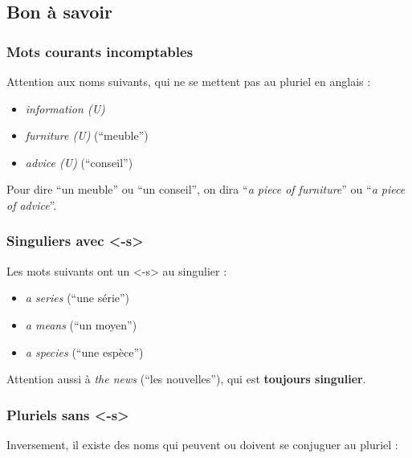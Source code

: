 \documentclass[
  10pt,
]{article}
\providecommand{\tightlist}{%
  \setlength{\itemsep}{0pt}\setlength{\parskip}{0pt}}
\begin{document}
\hypertarget{bon-uxe0-savoir}{%
\subsection{Bon à savoir}\label{bon-uxe0-savoir}}

\hypertarget{mots-courants-incomptables}{%
\subsubsection{Mots courants incomptables}\label{mots-courants-incomptables}}

Attention aux noms suivants, qui ne se mettent pas au pluriel en anglais :

\begin{itemize}
\tightlist
\item
  \emph{information (U)}
\item
  \emph{furniture (U)} (``meuble'')
\item
  \emph{advice (U)} (``conseil'')
\end{itemize}

Pour dire ``un meuble'' ou ``un conseil'', on dira ``\emph{a piece of furniture}'' ou ``\emph{a piece of advice}''.

\hypertarget{singuliers-avec--s}{%
\subsubsection{Singuliers avec \textless-s\textgreater{}}\label{singuliers-avec--s}}

Les mots suivants ont un \textless-s\textgreater{} au singulier :

\begin{itemize}
\tightlist
\item
  \emph{a series} (``une série'')
\item
  \emph{a means} (``un moyen'')
\item
  \emph{a species} (``une espèce'')
\end{itemize}

Attention aussi à \color[HTML]{f44336}\emph{the news} \color{black} (``les nouvelles''), qui est \textbf{toujours singulier}.

\hypertarget{pluriels-sans--s}{%
\subsubsection{Pluriels sans \textless-s\textgreater{}}\label{pluriels-sans--s}}

Inversement, il existe des noms qui peuvent ou doivent se conjuguer au pluriel :
\end{document}
